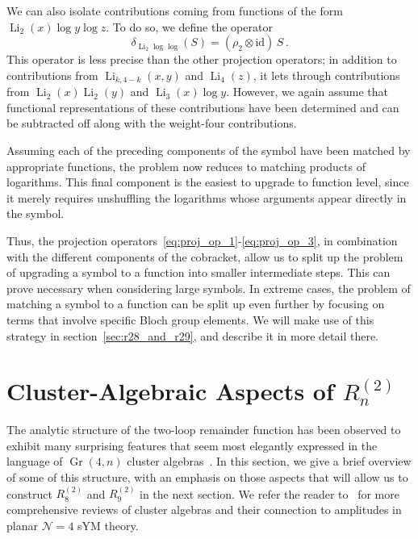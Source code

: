 \documentclass[11pt]{article}
\DeclareMathOperator{\Gr}{Gr}
\DeclareMathOperator{\Li}{Li}
\def\pdfeq#1{\texorpdfstring{$#1$}{a}}
\begin{document}
We can also isolate contributions coming from functions of the form $\Li_2(x) \log y  \log z$. To do so, we define the operator
\begin{equation}
\delta_{\Li_2 \log \log} (S)= (\rho_2 \otimes \text{id})\, S \, . \label{eq:proj_op_3}
\end{equation}
This operator is less precise than the other projection operators; in addition to contributions from $\Li_{k,4-k}(x,y)$ and $\Li_4(z)$, it lets through contributions from $\Li_2(x) \Li_2(y)$ and $\Li_3(x) \log y$. However, we again assume that functional representations of these contributions have been determined and can be subtracted off along with the weight-four contributions. 

Assuming each of the preceding components of the symbol have been matched by appropriate functions, the problem now reduces to matching products of logarithms. This final component is the easiest to upgrade to function level, since it merely requires unshuffling the logarithms whose arguments appear directly in the symbol.  
 
Thus, the projection operators~\eqref{eq:proj_op_1}-\eqref{eq:proj_op_3}, in combination with the different components of the cobracket, allow us to split up the problem of upgrading a symbol to a function into smaller intermediate steps. This can prove necessary when considering large symbols. In extreme cases, the problem of matching a symbol to a function can be split up even further by focusing on terms that involve specific Bloch group elements. We will make use of this strategy in section~\ref{sec:r28_and_r29}, and describe it in more detail there. 


\section{Cluster-Algebraic Aspects of \pdfeq{R_n^{(2)}}}
\label{sec:cluster_algebraic_structure}

The analytic structure of the two-loop remainder function has been observed to exhibit many surprising features that seem most elegantly expressed in the language of $\Gr(4,n)$ cluster algebras~\cite{1021.16017}.  In this section, we give a brief overview of some of this structure, with an emphasis on those aspects that will allow us to construct $R_8^{(2)}$\! and $R_9^{(2)}$\! in the next section. We refer the reader to~\cite{Golden:2013xva,Golden:2018gtk} for more comprehensive reviews of cluster algebras and their connection to amplitudes in planar $\mathcal{N} = 4$ sYM theory. 
\end{document}
